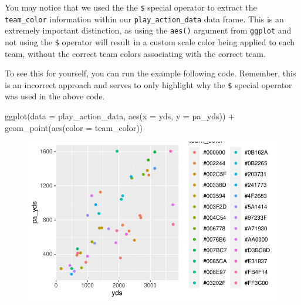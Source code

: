 \documentclass[
  letterpaper,
]{krantz}
\newenvironment{Shaded}{\begin{snugshade}}{\end{snugshade}}
\newcommand{\AttributeTok}[1]{\textcolor[rgb]{0.40,0.45,0.13}{#1}}
\newcommand{\FunctionTok}[1]{\textcolor[rgb]{0.28,0.35,0.67}{#1}}
\newcommand{\NormalTok}[1]{\textcolor[rgb]{0.00,0.23,0.31}{#1}}
\newcommand{\SpecialCharTok}[1]{\textcolor[rgb]{0.37,0.37,0.37}{#1}}
\begin{document}
\begin{tcolorbox}[enhanced jigsaw, left=2mm, toprule=.15mm, opacitybacktitle=0.6, leftrule=.75mm, bottomrule=.15mm, colbacktitle=quarto-callout-important-color!10!white, breakable, colback=white, bottomtitle=1mm, toptitle=1mm, title=\textcolor{quarto-callout-important-color}{\faExclamation}\hspace{0.5em}{Important}, coltitle=black, titlerule=0mm, arc=.35mm, opacityback=0, colframe=quarto-callout-important-color-frame, rightrule=.15mm]

You may notice that we used the the \texttt{\$} special operator to
extract the \texttt{team\_color} information within our
\texttt{play\_action\_data} data frame. This is an extremely important
distinction, as using the \texttt{aes()} argument from \texttt{ggplot}
and not using the \texttt{\$} operator will result in a custom scale
color being applied to each team, without the correct team colors
associating with the correct team.

To see this for yourself, you can run the example following code.
Remember, this is an incorrect approach and serves to only highlight why
the \texttt{\$} special operator was used in the above code.

\begin{Shaded}
\begin{Highlighting}[]
\FunctionTok{ggplot}\NormalTok{(}\AttributeTok{data =}\NormalTok{ play\_action\_data, }\FunctionTok{aes}\NormalTok{(}\AttributeTok{x =}\NormalTok{ yds, }\AttributeTok{y =}\NormalTok{ pa\_yds)) }\SpecialCharTok{+}
  \FunctionTok{geom\_point}\NormalTok{(}\FunctionTok{aes}\NormalTok{(}\AttributeTok{color =}\NormalTok{ team\_color))}
\end{Highlighting}
\end{Shaded}

\begin{figure}[H]

{\centering \includegraphics{04-nfl-analytics-visualization_files/figure-pdf/incorrect-use-of-aes-1.pdf}

}

\end{figure}

\end{tcolorbox}
\end{document}
